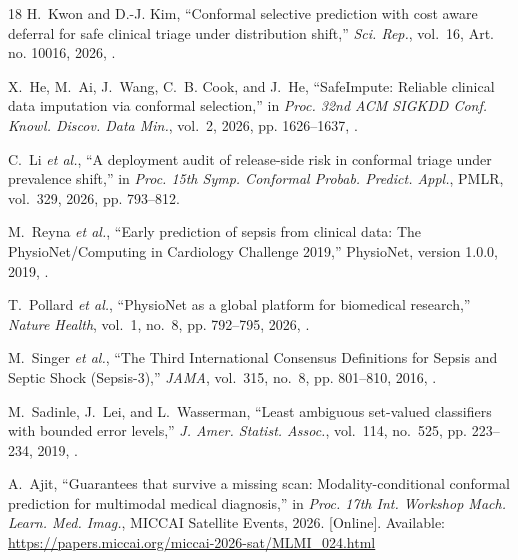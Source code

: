 \documentclass[conference]{IEEEtran}
\begin{document}
\begin{thebibliography}{18}
H.~Kwon and D.-J. Kim, ``Conformal selective prediction with cost aware deferral for safe clinical triage under distribution shift,'' \emph{Sci. Rep.}, vol.~16, Art. no. 10016, 2026, .

X.~He, M.~Ai, J.~Wang, C.~B. Cook, and J.~He, ``SafeImpute: Reliable clinical data imputation via conformal selection,'' in \emph{Proc. 32nd ACM SIGKDD Conf. Knowl. Discov. Data Min.}, vol.~2, 2026, pp. 1626--1637, .

C.~Li \emph{et al.}, ``A deployment audit of release-side risk in conformal triage under prevalence shift,'' in \emph{Proc. 15th Symp. Conformal Probab. Predict. Appl.}, PMLR, vol.~329, 2026, pp. 793--812.

M.~Reyna \emph{et al.}, ``Early prediction of sepsis from clinical data: The PhysioNet/Computing in Cardiology Challenge 2019,'' PhysioNet, version 1.0.0, 2019, .

T.~Pollard \emph{et al.}, ``PhysioNet as a global platform for biomedical research,'' \emph{Nature Health}, vol.~1, no.~8, pp. 792--795, 2026, .

M.~Singer \emph{et al.}, ``The Third International Consensus Definitions for Sepsis and Septic Shock (Sepsis-3),'' \emph{JAMA}, vol.~315, no.~8, pp. 801--810, 2016, .

M.~Sadinle, J.~Lei, and L.~Wasserman, ``Least ambiguous set-valued classifiers with bounded error levels,'' \emph{J. Amer. Statist. Assoc.}, vol.~114, no.~525, pp. 223--234, 2019, .

A.~Ajit, ``Guarantees that survive a missing scan: Modality-conditional conformal prediction for multimodal medical diagnosis,'' in \emph{Proc. 17th Int. Workshop Mach. Learn. Med. Imag.}, MICCAI Satellite Events, 2026. [Online]. Available: \url{https://papers.miccai.org/miccai-2026-sat/MLMI_024.html}

\end{thebibliography}
\end{document}
